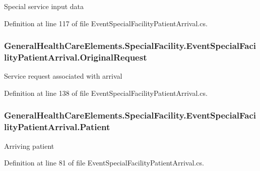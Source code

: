 Special service input data 



Definition at line 117 of file Event\+Special\+Facility\+Patient\+Arrival.\+cs.

\subsubsection[{\texorpdfstring{Original\+Request}{OriginalRequest}}]{ General\+Health\+Care\+Elements.\+Special\+Facility.\+Event\+Special\+Facility\+Patient\+Arrival.\+Original\+Request\hspace{0.3cm}{\ttfamily [get]}}\hypertarget{class_general_health_care_elements_1_1_special_facility_1_1_event_special_facility_patient_arrival_ab2340e4557ee282febe6f127e4b94f4a}{}\label{class_general_health_care_elements_1_1_special_facility_1_1_event_special_facility_patient_arrival_ab2340e4557ee282febe6f127e4b94f4a}


Service request associated with arrival 



Definition at line 138 of file Event\+Special\+Facility\+Patient\+Arrival.\+cs.

\subsubsection[{\texorpdfstring{Patient}{Patient}}]{ General\+Health\+Care\+Elements.\+Special\+Facility.\+Event\+Special\+Facility\+Patient\+Arrival.\+Patient\hspace{0.3cm}{\ttfamily [get]}}\hypertarget{class_general_health_care_elements_1_1_special_facility_1_1_event_special_facility_patient_arrival_a8abc2c1dee6da5de7d4378d84b034757}{}\label{class_general_health_care_elements_1_1_special_facility_1_1_event_special_facility_patient_arrival_a8abc2c1dee6da5de7d4378d84b034757}


Arriving patient 



Definition at line 81 of file Event\+Special\+Facility\+Patient\+Arrival.\+cs.

